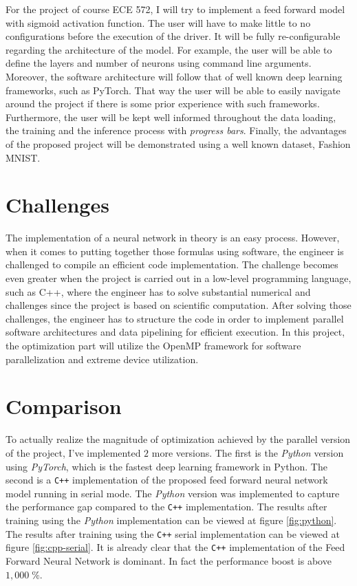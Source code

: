 For the project of course ECE 572, I will try to implement a feed forward model with sigmoid activation function. The user will have to make little to no configurations before the execution of the driver. It will be fully re-configurable regarding the architecture of the model. For example, the user will be able to define the layers and number of neurons using command line arguments. Moreover, the software architecture will follow that of well known deep learning frameworks, such as PyTorch\cite{paszke2019pytorch}. That way the user will be able to easily navigate around the project if there is some prior experience with such frameworks. Furthermore, the user will be kept well informed throughout the data loading, the training and the inference process with \textit{progress bars}. Finally, the advantages of the proposed project will be demonstrated using a well known dataset, Fashion MNIST\cite{FashionMNIST2017Xiao}.

\section{Challenges}

The implementation of a neural network in theory is an easy process. However, when it comes to putting together those formulas using software, the engineer is challenged to compile an efficient code implementation. The challenge becomes even greater when the project is carried out in a low-level programming language, such as C++, where the engineer has to solve substantial numerical and challenges since the project is based on scientific computation. After solving those challenges, the engineer has to structure the code in order to implement parallel software architectures and data pipelining for efficient execution. In this project, the optimization part will utilize the OpenMP framework for software parallelization and extreme device utilization.

\section{Comparison}

To actually realize the magnitude of optimization achieved by the parallel version of the project, I've implemented $2$ more versions. The first is the \textit{Python} version using \textit{PyTorch}, which is the fastest deep learning framework in Python. The second is a \texttt{C++} implementation of the proposed feed forward neural network model running in serial mode. The \textit{Python} version was implemented to capture the performance gap compared to the \texttt{C++} implementation. The results after training using the \textit{Python} implementation can be viewed at figure \ref{fig:python}. The results after training using the \texttt{C++} serial implementation can be viewed at figure \ref{fig:cpp-serial}. It is already clear that the \texttt{C++} implementation of the Feed Forward Neural Network is dominant. In fact the performance boost is above $1,000 \; \%$.

